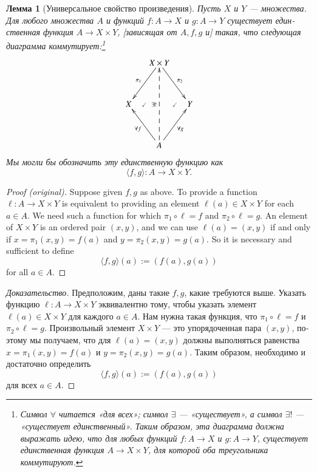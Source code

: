 \documentclass[a4paper]{book}
\def\to{\rightarrow}
\def\taking{\colon}
\def\la{\langle}
\def\ra{\rangle}
\newcommand{\prodmap}[2]{\la#1,#2\ra}
\theoremstyle{myth}
\newenvironment{proofENG}{\begin{proof}[Proof (original)]}{\end{proof}}
\newtheorem{lemmaRUS}[envRUS]{Лемма}
\newenvironment{proofRUS}{\begin{proof}[Доказательство]}{\end{proof}}
\begin{document}
\begin{russian}
\begin{lemmaRUS}[Универсальное свойство произведения]\label{lemma:up for prod}
Пусть $X$ и $Y$ — множества. Для любого множества $A$ и функций $f\taking A\to X$ и $g\taking A\to Y$ существует единственная функция $A\to X\times Y$, [зависящая от $A, f, g$ и] такая, что следующая диаграмма коммутирует:\footnote{Символ $\forall$ читается «для всех»; символ $\exists$ — «существует», а символ $\exists!$ — «существует единственный». Таким образом, эта диаграмма должна выражать идею, что для любых функций $f\taking A\to X$ и $g\taking A\to Y$, существует единственная функция $A\to X\times Y$, для которой оба треугольника коммутируют.}
\begin{align}\label{dia:univ prop for products}
\xymatrix@=15pt{&X\times Y\ar[ldd]_{\pi_1}\ar[rdd]^{\pi_2}\\\\X\ar@{}[r]|{\checkmark}&&Y\ar@{}[l]|{\checkmark}\\\\&A\ar[luu]^{\forall f}\ar[ruu]_{\forall g}\ar@{-->}[uuuu]^{\exists !}}
\end{align}
Мы могли бы обозначить эту единственную функцию как $$\prodmap{f}{g}\taking A\to X\times Y.$$
\end{lemmaRUS}

\begin{proofENG}
Suppose given $f,g$ as above. To provide a function $\ell\taking A\to X\times Y$ is equivalent to providing an element $\ell(a)\in X\times Y$ for each $a\in A$. We need such a function for which $\pi_1\circ \ell=f$ and $\pi_2\circ \ell=g$. An element of $X\times Y$ is an ordered pair $(x,y)$, and we can use $\ell(a)=(x,y)$ if and only if $x=\pi_1(x,y)=f(a)$ and $y=\pi_2(x,y)=g(a)$. So it is necessary and sufficient to define $$\prodmap{f}{g}(a):=(f(a),g(a))$$ for all $a\in A$.
\end{proofENG}

\begin{proofRUS}
Предположим, даны такие $f,g$, какие требуются выше. Указать функцию $\ell\taking A\to X\times Y$ эквивалентно тому, чтобы указать элемент $\ell(a)\in X\times Y$ для каждого $a\in A$. Нам нужна такая функция, что $\pi_1\circ \ell=f$ и $\pi_2\circ \ell=g$. Произвольный элемент $X\times Y$ — это упорядоченная пара $(x,y)$, поэтому мы получаем, что для $\ell(a)=(x,y)$ должны выполняться равенства $x=\pi_1(x,y)=f(a)$ и $y=\pi_2(x,y)=g(a)$. Таким образом, необходимо и достаточно определить $$\prodmap{f}{g}(a):=(f(a),g(a))$$ для всех $a\in A$.
\end{proofRUS}


\end{russian}
\end{document}
